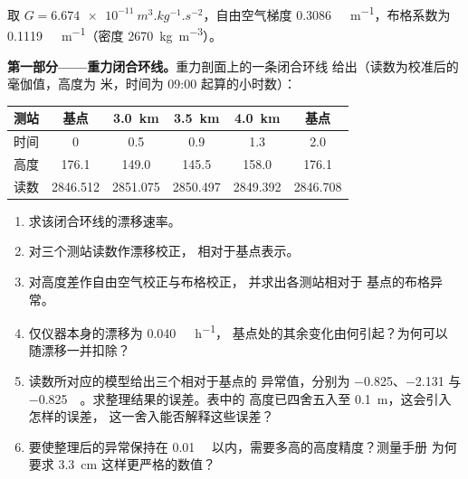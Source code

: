\begin{problem}
\label{pb:b3:field-lab-methods-3:1}
取 $G = \qty{6.674e-11}{m^3.kg^{-1}.s^{-2}}$，自由空气梯度
\qty{0.3086}{\milli\gal.m^{-1}}，布格系数为
\qty{0.1119}{\milli\gal.m^{-1}}（密度 \qty{2670}{kg.m^{-3}}）。

\medskip\noindent\textbf{第一部分——重力闭合环线。}重力剖面上的一条闭合环线
给出（读数为校准后的毫伽值，高度为
米，时间为 09:00 起算的小时数）：
\begin{center}
\small
\begin{tabular}{lccccc}
\hline
测站 & 基点 & \qty{3.0}{km} & \qty{3.5}{km} & \qty{4.0}{km} & 基点 \\
\hline
时间 & 0 & 0.5 & 0.9 & 1.3 & 2.0 \\
高度 & 176.1 & 149.0 & 145.5 & 158.0 & 176.1 \\
读数 & 2846.512 & 2851.075 & 2850.497 & 2849.392 & 2846.708 \\
\hline
\end{tabular}
\end{center}
\begin{enumerate}
\item 求该闭合环线的漂移速率。
\item 对三个测站读数作漂移校正，
  相对于基点表示。
\item 对高度差作自由空气校正与布格校正，
  并求出各测站相对于
  基点的布格异常。
\item 仅仪器本身的漂移为 \qty{0.040}{\milli\gal.h^{-1}}，
  基点处的其余变化由何引起？为何可以
  随漂移一并扣除？
\item 读数所对应的模型给出三个相对于基点的
  异常值，分别为 \num{-0.825}、\num{-2.131} 与
  \qty{-0.825}{\milli\gal}。求整理结果的误差。表中的
  高度已四舍五入至 \qty{0.1}{m}，这会引入怎样的误差，
  这一舍入能否解释这些误差？
\item 要使整理后的异常保持在
  \qty{0.01}{\milli\gal} 以内，需要多高的高度精度？测量手册
  为何要求 \qty{3.3}{cm} 这样更严格的数值？
\end{enumerate}


\end{problem}
